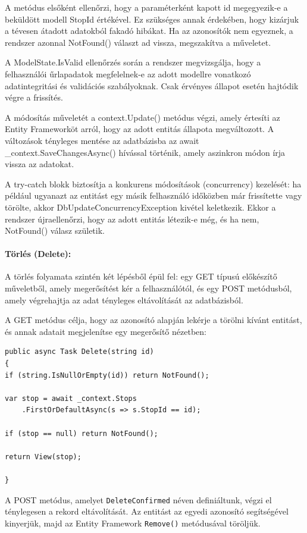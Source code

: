 A metódus elsőként ellenőrzi, hogy a paraméterként kapott id megegyezik-e a beküldött modell StopId értékével. Ez szükséges annak érdekében, hogy kizárjuk a tévesen átadott adatokból fakadó hibákat. Ha az azonosítók nem egyeznek, a rendszer azonnal NotFound() választ ad vissza, megszakítva a műveletet.

A ModelState.IsValid ellenőrzés során a rendszer megvizsgálja, hogy a felhasználói űrlapadatok megfelelnek-e az adott modellre vonatkozó adatintegritási és validációs szabályoknak. Csak érvényes állapot esetén hajtódik végre a frissítés.

A módosítás műveletét a context.Update() metódus végzi, amely értesíti az Entity Frameworköt arról, hogy az adott entitás állapota megváltozott. A változások tényleges mentése az adatbázisba az await \_context.SaveChangesAsync() hívással történik, amely aszinkron módon írja vissza az adatokat.

A try-catch blokk biztosítja a konkurens módosítások (concurrency) kezelését: ha például ugyanazt az entitást egy másik felhasználó időközben már frissítette vagy törölte, akkor DbUpdateConcurrencyException kivétel keletkezik. Ekkor a rendszer újraellenőrzi, hogy az adott entitás létezik-e még, és ha nem, NotFound() válasz születik.

\paragraph{Törlés (Delete):}
A törlés folyamata szintén két lépésből épül fel: egy GET típusú előkészítő műveletből, amely megerősítést kér a felhasználótól, és egy POST metódusból, amely végrehajtja az adat tényleges eltávolítását az adatbázisból.

A GET metódus célja, hogy az azonosító alapján lekérje a törölni kívánt entitást, és annak adatait megjelenítse egy megerősítő nézetben:

\begin{lstlisting}
public async Task Delete(string id)
{
if (string.IsNullOrEmpty(id)) return NotFound();

var stop = await _context.Stops
    .FirstOrDefaultAsync(s => s.StopId == id);

if (stop == null) return NotFound();

return View(stop);

}
\end{lstlisting}

A POST metódus, amelyet \texttt{DeleteConfirmed} néven definiáltunk, végzi el ténylegesen a rekord eltávolítását. Az entitást az egyedi azonosító segítségével kinyerjük, majd az Entity Framework \texttt{Remove()} metódusával töröljük.

